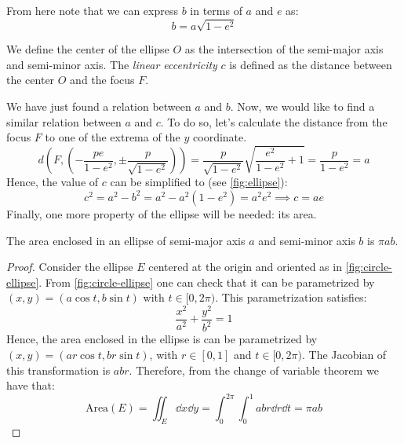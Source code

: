 \documentclass[../main.tex]{subfiles}
\begin{document}
\begin{figure}[ht]

\end{figure}
From here note that we can express $b$ in terms of $a$ and $e$ as:
\begin{equation}\label{eq:ellipse_b_a}
  b=a\sqrt{1-e^2}
\end{equation}
\begin{definition}
  We define the center of the ellipse $O$ as the intersection of the semi-major axis and semi-minor axis. The \emph{linear eccentricity} $c$ is defined as the distance between the center $O$ and the focus $F$.
\end{definition}
We have just found a relation between $a$ and $b$. Now, we would like to find a similar relation between $a$ and $c$. To do so, let's calculate the distance from the focus $F$ to one of the extrema of the $y$ coordinate.
\begin{equation}
  d\left(F,\left(-\frac{pe}{1-e^2},\pm \frac{p}{\sqrt{1-e^2}}\right)\right)=\frac{p}{\sqrt{1-e^2}}\sqrt{\frac{e^2}{1-e^2}+1}=\frac{p}{1-e^2}=a
\end{equation}
Hence, the value of $c$ can be simplified to (see \cref{fig:ellipse}):
\begin{equation}
  c^2=a^2-b^2=a^2-a^2(1-e^2)=a^2e^2\implies c=ae
\end{equation}
Finally, one more property of the ellipse will be needed: its area.
\begin{proposition}
  The area enclosed in an ellipse of semi-major axis $a$ and semi-minor axis $b$ is $\pi a b$.
\end{proposition}
\begin{proof}
  Consider the ellipse $E$ centered at the origin and oriented as in \cref{fig:circle-ellipse}. From \cref{fig:circle-ellipse} one can check that it can be parametrized by $(x,y)=(a\cos t,b\sin t)$ with $ t\in[0,2\pi)$. This parametrization satisfies:
  \begin{equation}
    \frac{x^2}{a^2}+\frac{y^2}{b^2}=1
  \end{equation}
  Hence, the area enclosed in the ellipse is can be parametrized by $(x, y)=(ar\cos t,br\sin t)$, with $r\in[0,1]$ and $t\in[0,2\pi)$. The Jacobian of this transformation is $abr$. Therefore, from the change of variable theorem we have that:
  \begin{equation}
    \mathrm{Area}(E)=\iint_E\dd{x}\dd{y}=\int_{0}^{2\pi}\int_{0}^{1}abr\dd{r}\dd{t}=\pi ab
  \end{equation}
\end{proof}
\end{document}
